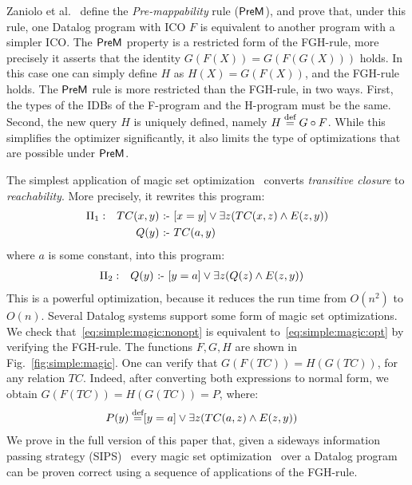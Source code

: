 \begin{ex} Zaniolo et
  al.~\cite{DBLP:journals/tplp/ZanioloYDSCI17} define the {\em
    Pre-mappability} rule ($\textsf{PreM}$), and prove that, under this
  rule, one Datalog program with ICO $F$ is equivalent to
  another program with a simpler ICO.
  The $\textsf{PreM}$ property is a
  restricted form of the FGH-rule, more precisely it asserts that the
  identity $G(F(X))=G(F(G(X)))$ holds.  In this case one can simply
  define $H$ as $H(X) = G(F(X))$, and the FGH-rule holds.  The $\textsf{PreM}$
  rule is more restricted than the FGH-rule, in two ways.  First, the
  types of the IDBs of the F-program and the H-program must be the
  same.  Second, the new query $H$ is uniquely
  defined, namely $H \stackrel{\text{def}}{=} G\circ F$.  While this simplifies the
  optimizer significantly, it also limits the type of optimizations
  that are possible under $\textsf{PreM}$.
\end{ex}


\begin{ex}\label{ex:simple:magic} The simplest
  application of magic set
  optimization~\cite{DBLP:conf/pods/BancilhonMSU86,DBLP:conf/sigmod/MumickP94,DBLP:conf/sigmod/MumickFPR90}
  converts {\em transitive closure} to {\em reachability}.  More
  precisely, it rewrites this program:
%
  \begin{align}
\Pi_1: &&    TC(x,y) \text{ :- } & [x=y] \vee \exists z(TC(x,z) \wedge E(z,y))\nonumber\\
       &&    Q(y) \text{ :- } & TC(a,y) \label{eq:simple:magic:nonopt}
  \end{align}
%
  where $a$ is some constant, into this program:
%
  \begin{align}
\Pi_2: &&   Q(y) \text{ :- } & [y=a] \vee \exists z(Q(z) \wedge E(z,y)) \label{eq:simple:magic:opt}
  \end{align}
%
  This is a powerful optimization, because it reduces the run time from
  $O(n^2)$ to $O(n)$.  Several Datalog systems support some form of
  magic set optimizations.  We check
  that~\eqref{eq:simple:magic:nonopt} is equivalent
  to~\eqref{eq:simple:magic:opt} by verifying the FGH-rule.  The
  functions $F, G, H$ are shown in Fig.~\ref{fig:simple:magic}.  One
  can verify that $G(F(TC))=H(G(TC))$, for any relation $TC$.  Indeed,
  after converting both expressions to normal form, we obtain
  $G(F(TC))=H(G(TC)) = P$, where:
%
  \begin{align*}
    P(y) \stackrel{\text{def}}{=} & [y=a] \vee \exists z(TC(a,z) \wedge E(z,y))
  \end{align*}
  We prove in the full version of this paper that, given a sideways information
  passing strategy (SIPS)~\cite{DBLP:journals/jlp/BeeriR91} every magic set
  optimization~\cite{DBLP:journals/jlp/BalbinPRM91} over a Datalog program can be
  proven correct using a sequence of applications of the FGH-rule.
\end{ex}

